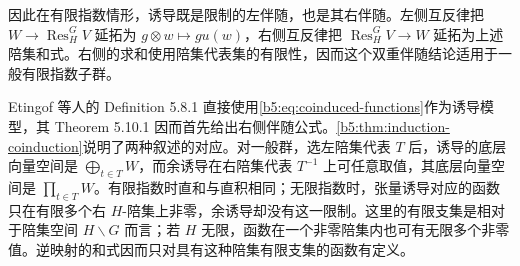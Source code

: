 因此在有限指数情形，诱导既是限制的左伴随，也是其右伴随。左侧互反律把 \(W\to\operatorname{Res}_H^G V\) 延拓为 \(g\otimes w\mapsto gu(w)\)，右侧互反律把 \(\operatorname{Res}_H^G V\to W\) 延拓为上述陪集和式。右侧的求和使用陪集代表集的有限性，因而这个双重伴随结论适用于一般有限指数子群。

\ProseParagraphBreak
Etingof 等人的 Definition 5.8.1 直接使用\eqref{b5:eq:coinduced-functions}作为诱导模型，其 Theorem 5.10.1 因而首先给出右侧伴随公式\cite[Sections 5.8, 5.10, pp. 105--109]{EtingofEtAl2011RepresentationTheory}。\cref{b5:thm:induction-coinduction}说明了两种叙述的对应。对一般群，选左陪集代表 \(T\) 后，诱导的底层向量空间是 \(\bigoplus_{t\in T}W\)，而余诱导在右陪集代表 \(T^{-1}\) 上可任意取值，其底层向量空间是 \(\prod_{t\in T}W\)。有限指数时直和与直积相同；无限指数时，张量诱导对应的函数只在有限多个右 \(H\)-陪集上非零，余诱导却没有这一限制。这里的有限支集是相对于陪集空间 \(H\backslash G\) 而言；若 \(H\) 无限，函数在一个非零陪集内也可有无限多个非零值。逆映射的和式因而只对具有这种陪集有限支集的函数有定义。

